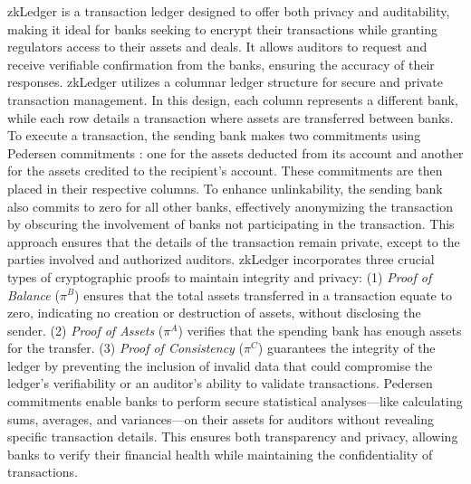 zkLedger \cite{zkLedger2018} is a transaction ledger designed to offer both privacy and auditability, making it ideal for banks seeking to encrypt their transactions while granting regulators access to their assets and deals. It allows auditors to request and receive verifiable confirmation from the banks, ensuring the accuracy of their responses. zkLedger utilizes a columnar ledger structure for secure and private transaction management. In this design, each column represents a different bank, while each row details a transaction where assets are transferred between banks. To execute a transaction, the sending bank makes two commitments using Pedersen commitments \cite{petersen1997convert}: one for the assets deducted from its account and another for the assets credited to the recipient's account. These commitments are then placed in their respective columns. To enhance unlinkability, the sending bank also commits to zero for all other banks, effectively anonymizing the transaction by obscuring the involvement of banks not participating in the transaction. This approach ensures that the details of the transaction remain private, except to the parties involved and authorized auditors. zkLedger incorporates three crucial types of cryptographic proofs to maintain integrity and privacy: (1) \textit{Proof of Balance} ($\pi^{B}$) ensures that the total assets transferred in a transaction equate to zero, indicating no creation or destruction of assets, without disclosing the sender. (2) \textit{Proof of Assets} ($\pi^{A}$) verifies that the spending bank has enough assets for the transfer. (3) \textit{Proof of Consistency} ($\pi^{C}$) guarantees the integrity of the ledger by preventing the inclusion of invalid data that could compromise the ledger's verifiability or an auditor's ability to validate transactions. Pedersen commitments enable banks to perform secure statistical analyses—like calculating sums, averages, and variances—on their assets for auditors without revealing specific transaction details. This ensures both transparency and privacy, allowing banks to verify their financial health while maintaining the confidentiality of transactions.
